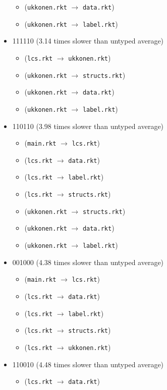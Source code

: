 \documentclass{article}
\newcommand{\mono}[1]{\texttt{#1}}
\begin{document}
\begin{itemize}
\begin{itemize}
  \item (\mono{ukkonen.rkt} $\rightarrow$ \mono{data.rkt})
  \item (\mono{ukkonen.rkt} $\rightarrow$ \mono{label.rkt})
  \end{itemize}
\item 111110 (3.14 times slower than untyped average)
  \begin{itemize}
  \item (\mono{lcs.rkt} $\rightarrow$ \mono{ukkonen.rkt})
  \item (\mono{ukkonen.rkt} $\rightarrow$ \mono{structs.rkt})
  \item (\mono{ukkonen.rkt} $\rightarrow$ \mono{data.rkt})
  \item (\mono{ukkonen.rkt} $\rightarrow$ \mono{label.rkt})
  \end{itemize}
\item 110110 (3.98 times slower than untyped average)
  \begin{itemize}
  \item (\mono{main.rkt} $\rightarrow$ \mono{lcs.rkt})
  \item (\mono{lcs.rkt} $\rightarrow$ \mono{data.rkt})
  \item (\mono{lcs.rkt} $\rightarrow$ \mono{label.rkt})
  \item (\mono{lcs.rkt} $\rightarrow$ \mono{structs.rkt})
  \item (\mono{ukkonen.rkt} $\rightarrow$ \mono{structs.rkt})
  \item (\mono{ukkonen.rkt} $\rightarrow$ \mono{data.rkt})
  \item (\mono{ukkonen.rkt} $\rightarrow$ \mono{label.rkt})
  \end{itemize}
\item 001000 (4.38 times slower than untyped average)
  \begin{itemize}
  \item (\mono{main.rkt} $\rightarrow$ \mono{lcs.rkt})
  \item (\mono{lcs.rkt} $\rightarrow$ \mono{data.rkt})
  \item (\mono{lcs.rkt} $\rightarrow$ \mono{label.rkt})
  \item (\mono{lcs.rkt} $\rightarrow$ \mono{structs.rkt})
  \item (\mono{lcs.rkt} $\rightarrow$ \mono{ukkonen.rkt})
  \end{itemize}
\item 110010 (4.48 times slower than untyped average)
  \begin{itemize}
  \item (\mono{lcs.rkt} $\rightarrow$ \mono{data.rkt})

\end{itemize}
\end{itemize}
\end{document}
